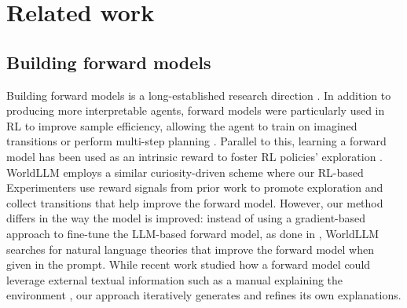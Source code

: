 \documentclass{article}
\begin{document}
\section{Related work}
\subsection{Building forward models}
Building forward models is a long-established research direction \citep{ha_world_2018, moerland_model-based_2022}. In addition to producing more interpretable agents, forward models were particularly used in RL to improve sample efficiency, allowing the agent to train on imagined transitions or perform multi-step planning \citep{hafner_dream_2020, hafner_mastering_2022, hafner_mastering_2024, schrittwieser_mastering_2020}. Parallel to this, learning a forward model has been used as an intrinsic reward to foster RL policies' exploration \citep{schmidhuber_possibility_1991, pathak_curiosity-driven_2017, burda_large-scale_2018, oudeyer_what_2007}. WorldLLM employs a similar curiosity-driven scheme where our RL-based Experimenters use reward signals from prior work to promote exploration and collect transitions that help improve the forward model. However, our method differs in the way the model is improved: instead of using a gradient-based approach to fine-tune the LLM-based forward model, as done in \citep{xiang_language_2023}, WorldLLM searches for natural language theories that improve the forward model when given in the prompt. While recent work studied how a forward model could leverage external textual information such as a manual explaining the environment \citep{zhang_language-guided_2024, dainese_reader_2023}, our approach iteratively generates and refines its own explanations. 
\end{document}
